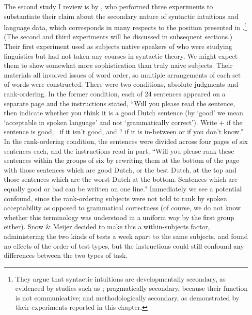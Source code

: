 The second study I review is by \citet{SnowEtAl1977}, who performed three experiments to substantiate their claim about the secondary nature of syntactic intuitions and language data, which corresponds in many respects to the position presented in .\footnote{They argue that syntactic intuitions are developmentally secondary, as evidenced by studies such as \citet{Hakes1980}; pragmatically secondary, because their function is not communicative; and methodologically secondary, as demonstrated by their experiments reported in this chapter.}
 (The second and third experiments will be discussed in subsequent sections.) Their first experiment used as subjects native speakers of  who were studying linguistics but had not taken any courses in syntactic theory. We might expect them to show somewhat more sophistication than truly naive subjects. Their materials all involved issues of word order, so multiple arrangements of each set of words were constructed. There were two conditions, absolute judgments and rank-ordering. In the former condition, each of 24 sentences appeared on a separate page and the instructions stated, ``Will you please read the sentence, then indicate whether you think it is a good Dutch sentence (by `good' we mean `acceptable in spoken language' and not `grammatically correct'). Write + if the sentence is good, \textminus~if it isn't good,
and ? if it is in-between or if you don't know.'' In the rank-ordering condition, the sentences were divided across four pages of six sentences each, and the instructions read in part, ``Will you please rank these sentences within the groups of six by rewriting them at the bottom of the page with those sentences which are good Dutch, or the best Dutch, at the top and those sentences which are the worst Dutch at the bottom. Sentences which are equally good or bad can be written on one line.'' Immediately we see a potential confound, since the rank-ordering subjects were not told to rank by spoken acceptability as opposed to grammatical correctness (of course, we do not know whether this terminology was understood in a uniform way by the first group either). Snow \& Meijer decided to make this a within-subjects
factor, administering the two kinds of tests a week apart to the same subjects, and found no effects of the order of test types, but the instructions could still confound any differences between the two types of task.

